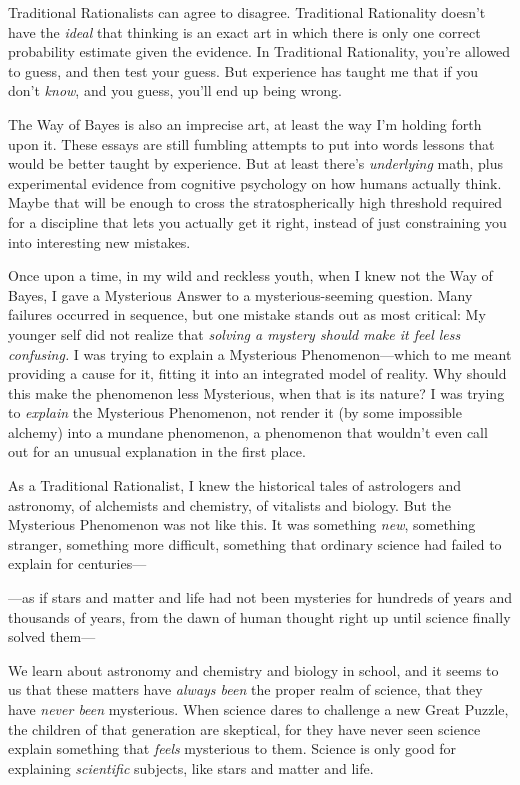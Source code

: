 {
 Traditional Rationalists can agree to disagree. Traditional
Rationality doesn't have the \textit{ideal} that
thinking is an exact art in which there is only one correct probability
estimate given the evidence. In Traditional Rationality,
you're allowed to guess, and then test your guess. But
experience has taught me that if you don't
\textit{know}, and you guess, you'll end up being
wrong.}

{
 The Way of Bayes is also an imprecise art, at least the way
I'm holding forth upon it. These essays are still
fumbling attempts to put into words lessons that would be better taught
by experience. But at least there's \textit{underlying}
math, plus experimental evidence from cognitive psychology on how
humans actually think. Maybe that will be enough to cross the
stratospherically high threshold required for a discipline that lets
you actually get it right, instead of just constraining you into
interesting new mistakes.}

\myendsectiontext


{
 Once upon a time, in my wild and reckless youth, when I knew not
the Way of Bayes, I gave a Mysterious Answer to a mysterious-seeming
question. Many failures occurred in sequence, but one mistake stands
out as most critical: My younger self did not realize that
\textit{solving a mystery should make it feel less confusing.} I was
trying to explain a Mysterious Phenomenon---which to me meant providing
a cause for it, fitting it into an integrated model of reality. Why
should this make the phenomenon less Mysterious, when that is its
nature? I was trying to \textit{explain} the Mysterious Phenomenon, not
render it (by some impossible alchemy) into a mundane phenomenon, a
phenomenon that wouldn't even call out for an unusual
explanation in the first place. }

{
 As a Traditional Rationalist, I knew the historical tales of
astrologers and astronomy, of alchemists and chemistry, of vitalists
and biology. But the Mysterious Phenomenon was not like this. It was
something \textit{new}, something stranger, something more difficult,
something that ordinary science had failed to explain for centuries---}

{
 {}---as if stars and matter and life had not been mysteries for
hundreds of years and thousands of years, from the dawn of human
thought right up until science finally solved them---}

{
 We learn about astronomy and chemistry and biology in school, and
it seems to us that these matters have \textit{always been} the proper
realm of science, that they have \textit{never been} mysterious. When
science dares to challenge a new Great Puzzle, the children of that
generation are skeptical, for they have never seen science explain
something that \textit{feels} mysterious to them. Science is only good
for explaining \textit{scientific} subjects, like stars and matter and
life.}

